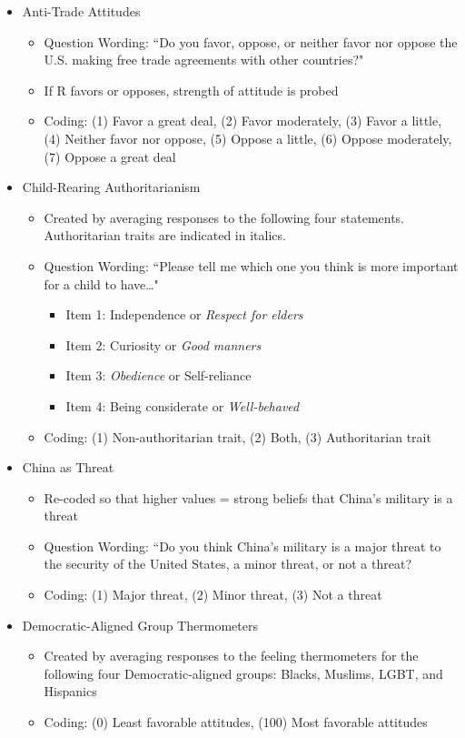 \documentclass[12pt]{article}
\begin{document}
\begin{appendices}
\begin{refsection}
\begin{itemize}
	\item Anti-Trade Attitudes
		\begin{itemize}
			\item Question Wording: ``Do you favor, oppose, or neither favor nor oppose the U.S. making free trade agreements with other countries?"
			\item If R favors or opposes, strength of attitude is probed
			\item Coding: (1) Favor a great deal, (2) Favor moderately, (3) Favor a little, (4) Neither favor nor oppose, (5) Oppose a little, (6) Oppose moderately, (7) Oppose a great deal
		\end{itemize}
		
	\item Child-Rearing Authoritarianism
		\begin{itemize}
			\item Created by averaging responses to the following four statements. Authoritarian traits are indicated in italics.
			\item Question Wording: ``Please tell me which one you think is more important for a child to have\ldots"
			\begin{itemize}
				\item Item 1: Independence or \textit{Respect for elders}
				\item Item 2: Curiosity or \textit{Good manners}
				\item Item 3: \textit{Obedience} or Self-reliance
				\item Item 4: Being considerate or \textit{Well-behaved}
			\end{itemize}
			\item Coding: (1) Non-authoritarian trait, (2) Both, (3) Authoritarian trait
		\end{itemize}
		
	\item China as Threat 
		\begin{itemize}
			\item Re-coded so that higher values = strong beliefs that China's military is a threat
			\item Question Wording: ``Do you think China's military is a major threat to the security of the United States, a minor threat, or not a threat?
			\item Coding: (1) Major threat, (2) Minor threat, (3) Not a threat
		\end{itemize}
		
	\item Democratic-Aligned Group Thermometers
		\begin{itemize}
			\item Created by averaging responses to the feeling thermometers for the following four Democratic-aligned groups: Blacks, Muslims, LGBT, and Hispanics
			\item Coding: (0) Least favorable attitudes, (100) Most favorable attitudes
		\end{itemize}
		

\end{itemize}
\end{refsection}
\end{appendices}
\end{document}
